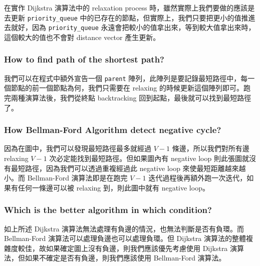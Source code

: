 \documentclass{article}[12pt]
\begin{document}
在實作 Dijkstra 演算法中的 relaxation process 時，雖然實際上我們要做的應該是去更新 \texttt{priority\_queue} 中的已存在的節點，但實際上，我們只要把更小的值推進去就好，因為 \texttt{priority\_queue} 永遠會把較小的值拿出來，等到較大值拿出來時，這個較大的值也不會對 distance vector 產生更新。

\subsubsection{How to find path of the shortest path?}

我們可以在程式中額外宣告一個 \texttt{parent} 陣列，此陣列是要記錄最短路徑中，每一個節點的前一個節點為何，我們只需要在 relaxing 的時候更新這個陣列即可。跑完兩種演算法後，我們從終點 backtracking 回到起點，最後就可以找到最短路徑了。

\subsubsection{How Bellman-Ford Algorithm detect negative cycle?}

因為在圖中，我們可以發現最短路徑最多就經過 $V-1$ 條邊，所以我們對所有邊 relaxing $V-1$ 次必定能找到最短路徑。但如果圖內有 negative loop 則此張圖就沒有最短路徑，因為我們可以透過重複經過此 negative loop 來使最短距離越來越小。而 Bellman-Ford 演算法即是在跑完 $V-1$ 迭代過程後再額外跑一次迭代，如果有任何一條邊可以被 relaxing 到，則此圖中就有 negative loop。

\subsubsection{Which is the better algorithm in which condition?}

如上所述 Dijkstra 演算法無法處理有負邊的情況，也無法判斷是否有負環。而 Bellman-Ford 演算法可以處理負邊也可以處理負環。但 Dijkstra 演算法的整體複雜度較佳，故如果確定圖上沒有負邊，則我們應該優先考慮使用 Dijkstra 演算法，但如果不確定是否有負邊，則我們應該使用 Bellman-Ford 演算法。
\end{document}
